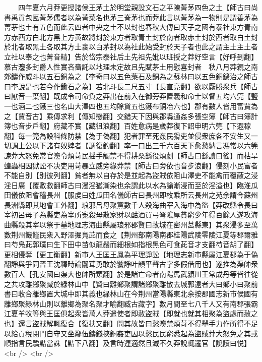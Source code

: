 　　四年夏六月莽更授諸侯王茅土於明堂親設文石之平陳菁茅四色之土【師古曰尚書禹貢包匭菁茅儒者以為菁菜名也茅三脊茅也而莽此言以菁茅為一物則是謂善茅為菁茅也土有五色而此云四者中央之土不以封也春秋大傳曰天子之國有泰社東方青南方赤西方白北方黑上方黄故將封於東方者取青土封於南者取赤土封於西者取白土封於北者取黑土各取其方土裹以白茅封以為社此始受封於天子者也此之謂主土主土者立社以奉之也菁音精】告於岱宗泰社后土先祖先妣以班授之莽好空言【好呼到翻】慕古灋多封爵人性實吝嗇託以地理未定故且先賦茅土用慰喜封者　秋八月莽親之南郊鑄作威斗以五石銅為之【李奇曰以五色藥石及銅為之蘇林曰以五色銅鑛治之師古曰李說是也若今作鍮石之為】若北斗長二尺五寸【長直亮翻】欲以厭勝衆兵【師古曰厭音一葉翻】既成令司命負之莽出在前入在御旁莽置羲和命士以督五均六筦【鹽一也酒二也鐵三也名山大澤四也五均賖貸五也鐵布銅冶六也】郡有數人皆用富賈為之【賈音古】乘傳求利【傳知戀翻】交錯天下因與郡縣通姦多張空簿【師古曰簿計簿也音步戶翻】府藏不實【藏徂浪翻】百姓愈病是歲莽復下詔申明六筦【下遐稼翻】每一筦為設科條防禁【為于偽翻】犯者罪至死姦民猾吏並侵衆庶各不安生又一切調上公以下諸有奴婢者【調復釣翻】率一口出三千六百天下愈愁納言馮常以六筦諫莽大怒免常官灋令煩苛民揺手觸禁不得耕桑繇役煩劇【師古曰繇讀曰徭】而枯旱蝗蟲相因獄訟不决吏用苛暴立威旁緣莽禁【師古曰旁依也音步浪翻】侵刻小民富者不能自别【别彼列翻】貧者無以自存於是並起為盜賊依阻山澤吏不能禽而覆蔽之浸淫日廣【覆敷救翻師古曰漫淫猶漸染也余謂此以水為諭漸浸而至於淫溢也】臨淮瓜田儀依阻會稽長州【服䖍曰姓瓜田名儀師古曰長州即枚乘所云長州之苑余謂今蘇州長洲縣即其地會工外翻】琅邪呂母聚黨數千人殺海曲宰入海中為盜【莽改縣令長曰宰初呂母子為縣吏為宰所寃殺母散家財以酤酒買弓弩隂厚貧窮少年得百餘人遂攻海曲縣殺其宰以祭于墓地理志海曲縣屬琅邪郡賢曰故城在密州莒縣東】其衆浸多至萬數荆州饑饉民衆入野澤掘鳬茈而食之【荆州部南陽南郡桂陽武陵零陵江夏等郡爾雅曰芍鳬茈郭璞曰生下田中苗似龍鬚而細根如指根黑色可食茈音才支翻芍音胡了翻】更相侵奪【更工衡翻】新市人王匡王鳳為平理諍訟【地理志新市縣屬江夏郡為于偽翻諍與爭同晉王沈釋時論闒茸勇敢於饕諍叶韻平聲古字多假借用也】遂推為渠帥衆數百人【孔安國曰渠大也帥所類翻】於是諸亡命者南陽馬武潁川王常成丹等皆往從之共攻離鄉聚臧於緑林山中【賢曰離鄉聚謂諸鄉聚離散去城郭遠者大曰鄉小曰聚前書曰收合離鄉置大城中即其義也緑林山在今荆州當陽縣東北余按郡國志新市侯國有離鄉聚緑林山則以離鄉為聚名聚才喻翻臧古藏字】數月間至七八千人又有南郡張霸江夏羊牧等與王匡俱起衆皆萬人莽遣使者即赦盜賊【即就也就其相聚為盜處而赦之也】還言盜賊解輒復合【復扶又翻】問其故皆曰愁灋禁煩苛不得舉手力作所得不足以給貢稅閉門自守又坐鄰伍鑄錢挾銅姦吏因以愁民民窮悉起為盜賊莽大怒免之其或順指言民驕黠當誅【黠下八翻】及言時運適然且滅不久莽說輒遷官【說讀曰悦】<br />
<br />
